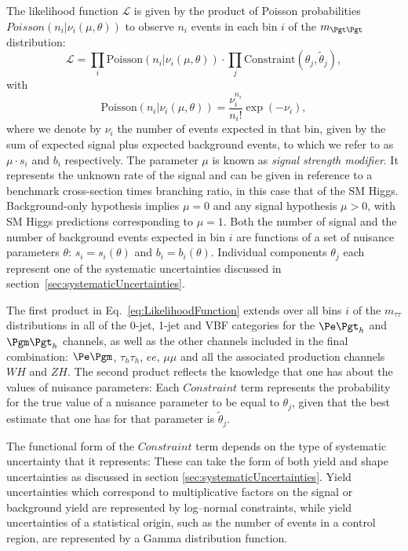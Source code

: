The likelihood function $\mathcal{L}$ is given by the product of Poisson probabilities 
$Poisson(n_{i} \vert \nu_{i}(\mu, \theta))$ to observe $n_{i}$ events in each bin
$i$ of the $m_{\Pgt\Pgt}$ distribution:
\begin{equation}
\mathcal{L} = \prod_{i} \mathrm{Poisson}(n_{i} \vert \nu_{i}(\mu, \theta)) \cdot
\prod_{j} \mathrm{Constraint}(\theta_{j}, \tilde{\theta}_{j}),
\label{eq:LikelihoodFunction}
\end{equation}
with
\begin{equation}
\mathrm{Poisson} ( n_{i} \vert \nu_{i}(\mu, \theta )) = \frac{\nu_{i}^{n_{i}}}{n_{i}!} \exp ( -\nu_{i} ),
\label{eq:PoissonDistribution}
\end{equation}
where we denote by $\nu_{i}$ the number of events expected in that bin,
given by the sum of expected signal plus expected background events,
to which we refer to as $\mu \cdot s_{i}$ and $b_{i}$ respectively.
The parameter $\mu$ is known as \emph{signal strength modifier}. 
It represents the unknown rate of the signal and can be given in reference to a
benchmark cross-section times branching ratio, in this case that of the \ac{SM}
Higgs. Background-only hypothesis implies $\mu = 0$ and any signal hypothesis $
\mu > 0$, with \ac{SM} Higgs predictions corresponding to $\mu = 1$.
Both the number of signal and the number of background events expected in bin $i$ 
are functions of a set of nuisance parameters $\theta$:
$s_{i} = s_{i} ( \theta )$ and $b_{i} = b_{i} ( \theta )$.
Individual components $\theta_{j}$ each represent one of the systematic uncertainties
discussed in section~\ref{sec:systematicUncertainties}.

The first product in Eq.~\ref{eq:LikelihoodFunction} extends over all bins $i$
of the $m_{\tau\tau}$ distributions in all of the 0-jet, 1-jet and VBF categories 
for the $\etau$ and $\mutau$ channels, as well as the other channels included in
the final combination: $\emu$, $\tau_{h}\tau_{h}$, $ee$, $\mu\mu$ and all the
associated production channels $WH$ and $ZH$. 
The second product reflects the knowledge that one has about the values of nuisance parameters:
Each $Constraint$ term represents the probability for the true value of a nuisance parameter to be equal to $\theta_{j}$,
given that the best estimate that one has for that parameter is
$\tilde{\theta}_{j}$.

The functional form of the $Constraint$ term depends on the type of systematic uncertainty that it represents:
These can take the form of both yield and shape uncertainties as discussed in
section \ref{sec:systematicUncertainties}. Yield uncertainties which correspond
to multiplicative factors on the signal or background yield are represented by
log--normal constraints, while yield uncertainties of a statistical origin,
such as the number of events in a control region, are represented by a Gamma
distribution function. 

